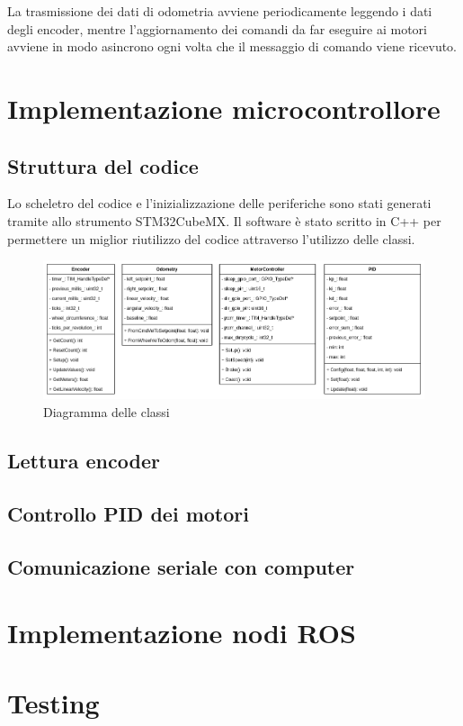 La trasmissione dei dati di odometria avviene periodicamente leggendo i dati degli encoder, mentre l'aggiornamento dei comandi da far eseguire ai motori avviene in modo asincrono ogni volta che il messaggio di comando viene ricevuto.

\section{Implementazione microcontrollore}
\subsection{Struttura del codice}
Lo scheletro del codice e l'inizializzazione delle periferiche sono stati generati tramite allo strumento STM32CubeMX. Il software è stato scritto in C++ per permettere un miglior riutilizzo del codice attraverso l'utilizzo delle classi.

\begin{figure}[H]
    \centering
    \includegraphics[scale=0.44]{images/diagramma_classi.png}
    \caption{Diagramma delle classi}
\end{figure}


\subsection{Lettura encoder}
\subsection{Controllo PID dei motori}
\cite{cross_pid}
\subsection{Comunicazione seriale con computer}
\section{Implementazione nodi ROS}
\section{Testing}
